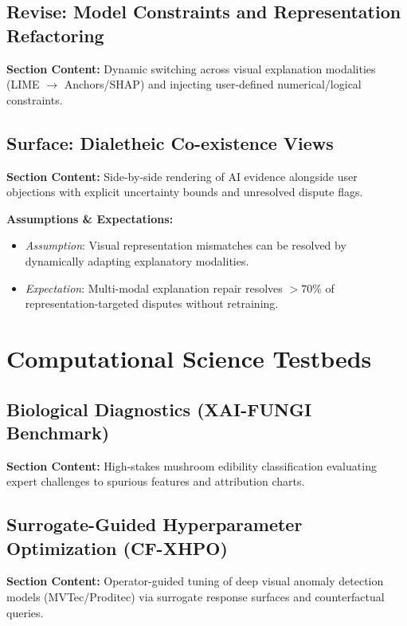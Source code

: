 \documentclass[preprint,12pt,3p,times]{elsarticle}
\begin{document}
\subsection{Revise: Model Constraints and Representation Refactoring}
\textbf{Section Content:} Dynamic switching across visual explanation modalities (LIME $\to$ Anchors/SHAP) and injecting user-defined numerical/logical constraints.

\subsection{Surface: Dialetheic Co-existence Views}
\textbf{Section Content:} Side-by-side rendering of AI evidence alongside user objections with explicit uncertainty bounds and unresolved dispute flags.

\textbf{Assumptions \& Expectations:}
\begin{itemize}
    \item \emph{Assumption}: Visual representation mismatches can be resolved by dynamically adapting explanatory modalities.
    \item \emph{Expectation}: Multi-modal explanation repair resolves $>70\%$ of representation-targeted disputes without retraining.
\end{itemize}

\section{Computational Science Testbeds}
\label{sec:testbeds}

\subsection{Biological Diagnostics (XAI-FUNGI Benchmark)}
\textbf{Section Content:} High-stakes mushroom edibility classification evaluating expert challenges to spurious features and attribution charts.

\subsection{Surrogate-Guided Hyperparameter Optimization (CF-XHPO)}
\textbf{Section Content:} Operator-guided tuning of deep visual anomaly detection models (MVTec/Proditec) via surrogate response surfaces and counterfactual queries.
\end{document}

